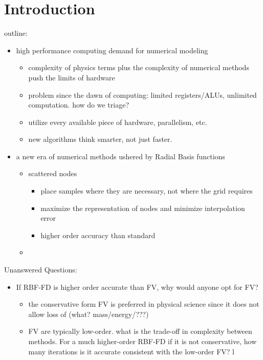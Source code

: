 
\chapter{Introduction}
outline:
\begin{itemize} 
\item high performance computing demand for numerical modeling
\begin{itemize} 
\item complexity of physics terms plus the complexity of numerical methods push the limits of hardware
\item problem since the dawn of computing: limited registers/ALUs, unlimited computation. how do we triage?
\item utilize every available piece of hardware, parallelism, etc.
\item new algorithms think smarter, not just faster.
\end{itemize}
\item a new era of numerical methods ushered by Radial Basis functions
\begin{itemize} 
\item scattered nodes
\begin{itemize}
\item place samples where they are necessary, not where the grid requires
\item maximize the representation of nodes and minimize interpolation error
\item higher order accuracy than standard 
\end{itemize}

\item 
\end{itemize}

\end{itemize}

Unanswered Questions: 
\begin{itemize} 
\item If RBF-FD is higher order accurate than FV, why would anyone opt for FV?
\begin{itemize} 
\item the conservative form FV is preferred in physical science since it does not allow loss of (what? mass/energy/???)
\item FV are typically low-order. what is the trade-off in complexity between methods. For a much higher-order RBF-FD if it is not conservative, how many iterations is it accurate consistent with the low-order FV? l
\end{itemize}

\end{itemize}




